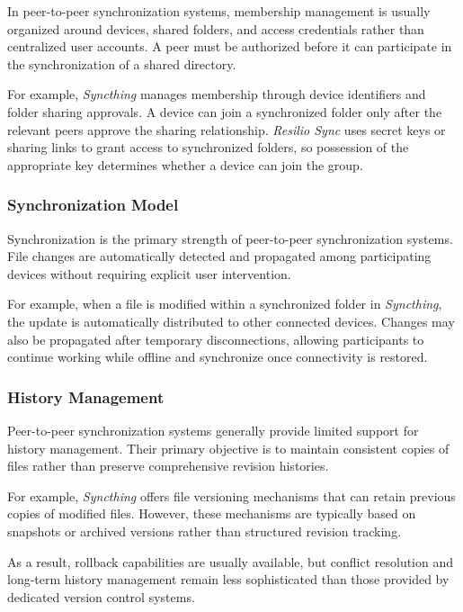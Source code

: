 In peer-to-peer synchronization systems, membership management
is usually organized around devices, shared folders, and access
credentials rather than centralized user accounts. A peer must
be authorized before it can participate in the synchronization
of a shared directory.

For example, \textit{Syncthing} manages membership through
device identifiers and folder sharing approvals. A device can
join a synchronized folder only after the relevant peers approve
the sharing relationship. \textit{Resilio Sync} uses secret keys
or sharing links to grant access to synchronized folders, so
possession of the appropriate key determines whether a device
can join the group.

\subsubsection{Synchronization Model}

Synchronization is the primary strength of peer-to-peer
synchronization systems. File changes are automatically
detected and propagated among participating devices without
requiring explicit user intervention.

For example, when a file is modified within a synchronized
folder in \textit{Syncthing}, the update is automatically
distributed to other connected devices. Changes may also be
propagated after temporary disconnections, allowing
participants to continue working while offline and synchronize
once connectivity is restored.

\subsubsection{History Management}

Peer-to-peer synchronization systems generally provide limited
support for history management. Their primary objective is to
maintain consistent copies of files rather than preserve
comprehensive revision histories.

For example, \textit{Syncthing} offers file versioning
mechanisms that can retain previous copies of modified files.
However, these mechanisms are typically based on snapshots or
archived versions rather than structured revision tracking.

As a result, rollback capabilities are usually available, but
conflict resolution and long-term history management remain
less sophisticated than those provided by dedicated version
control systems.

